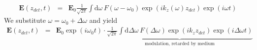 \documentclass[12pt,a4paper,twoside,openright,BCOR10mm,headsepline,titlepage,abstracton,chapterprefix,final]{scrreprt}
\newcommand\Vector[1]{{\mathbf{#1}}}
\newcommand\wavenumber{k}
\newcommand\scalarEfield{E}
\newcommand\Efield{\Vector{\scalarEfield}}
\newcommand\totald{\textrm{d}}
\begin{document}
\begin{eqnarray}
\Efield(z_{det}, t) &=& 
  \Efield_0 
  \frac{1}{\sqrt{2\pi}} \int \totald\omega\, 
  F(\omega-\omega_0)
  \exp (i \wavenumber_z(\omega) z_{det})
  \exp ( i \omega t)
\end{eqnarray}
We substitute $\omega = \omega_0 + \Delta \omega$ and yield
\begin{eqnarray}
\Efield(z_{det}, t) &=& 
  \Efield_0 \exp ( i \omega_0 t)
  \cdot
  \underbrace{
      \frac{1}{\sqrt{2\pi}} \int \totald\Delta\omega\, 
      F(\Delta \omega)
      \exp (i \wavenumber_z z_{det})
      \exp ( i \Delta \omega t)
      }_{\textrm{modulation, retarded by medium}}
\nonumber\\
\label{eq:time_of_flight_retarded_modulation}
\end{eqnarray}
\end{document}
